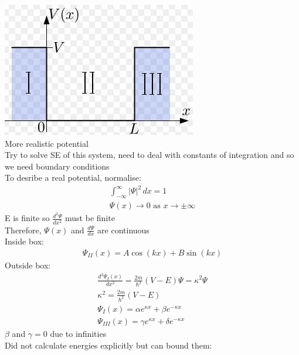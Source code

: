 \documentclass[a4paper, 11pt, fleqn, normalem]{report}
\begin{document}
\includegraphics{Finite.jpg} \\
More realistic potential \\
Try to solve SE of this system, need to deal with constants of integration and so we need boundary conditions \\
To desribe a real potential, normalise:
\begin{gather*}
    \int_{-\infty}^{\infty} |\Psi|^{2}\,dx = 1 \\
    \Psi(x) \rightarrow 0 \text{ as } x \rightarrow \pm\infty
\end{gather*}
E is finite so $\frac{d^{2}\Psi}{dx^{2}}$ must be finite \\
Therefore, $\Psi(x)$ and $\frac{d\Psi}{dx}$ are continuous \\
Inside box:
\begin{gather*}
    \Psi_{II}(x) = A\cos(kx) + B\sin(kx)
\end{gather*}
Outside box:
\begin{gather*}
    \frac{d^{2}\Psi_{I}(x)}{dx^{2}} = \frac{2m}{\hbar^{2}}(V - E)\Psi = \kappa^{2}\Psi \\
    \kappa^{2} = \frac{2m}{\hbar^{2}}(V -E) \\
    \Psi_{I}(x) = \alpha e^{\kappa x} + \beta e^{-\kappa x} \\
    \Psi_{III}(x) = \gamma e^{\kappa x} + \delta e^{-\kappa x}
\end{gather*}
$\beta$ and $\gamma = 0$ due to infinities \\
Did not calculate energies explicitly but can bound them:
\end{document}
